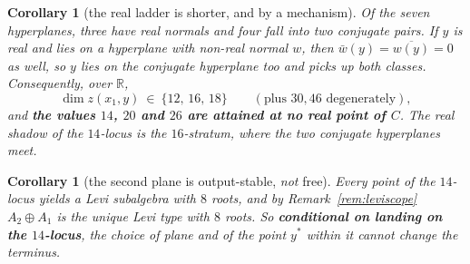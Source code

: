 \documentclass[11pt,reqno]{amsart}
\theoremstyle{plain}
\newtheorem{corollary}[theorem]{Corollary}
\theoremstyle{definition}
\theoremstyle{remark}
\newcommand{\R}{\mathbb{R}}
\begin{document}
\begin{corollary}[the real ladder is shorter, and by a mechanism]\label{cor:realladder}
Of the seven hyperplanes, three have real normals and four fall into two conjugate pairs.
If $y$ is real and lies on a hyperplane with non-real normal $w$, then $\bar w(y)=
\overline{w(y)}=0$ as well, so $y$ lies on the conjugate hyperplane too and picks up
\emph{both} classes. Consequently, over $\R$,
\[
   \dim z(x_1,y)\ \in\ \{12,\,16,\,18\}\qquad(\text{plus }30,46\text{ degenerately}),
\]
and \textbf{the values $14$, $20$ and $26$ are attained at no real point of $C$}. The real
shadow of the $14$-locus is the $16$-stratum, where the two conjugate hyperplanes meet.
\end{corollary}

\begin{corollary}[the second plane is output-stable, \emph{not} free]\label{cor:c7free}
Every point of the $14$-locus yields a Levi subalgebra with $8$ roots, and by
Remark~\ref{rem:leviscope} $A_2\oplus A_1$ is the unique Levi type with $8$ roots. So
\textbf{conditional on landing on the $14$-locus}, the choice of plane and of the point
$y^*$ within it cannot change the terminus.
\end{corollary}
\end{document}
